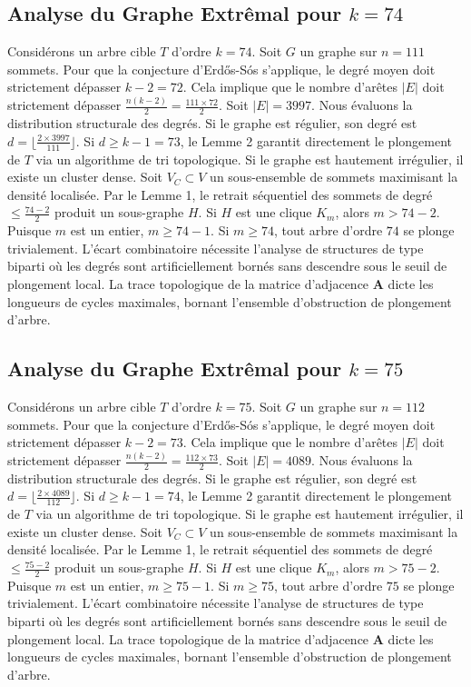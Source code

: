 \documentclass[11pt,a4paper]{article}
\begin{document}
\subsection{Analyse du Graphe Extr\^emal pour $k=74$}
Consid\'erons un arbre cible $T$ d'ordre $k=74$.
Soit $G$ un graphe sur $n=111$ sommets.
Pour que la conjecture d'Erd\H{o}s-S\'os s'applique, le degr\'e moyen doit strictement d\'epasser $k-2 = 72$.
Cela implique que le nombre d'ar\^etes $|E|$ doit strictement d\'epasser $\frac{n(k-2)}{2} = \frac{111 \times 72}{2}$.
Soit $|E| = 3997$.
Nous \'evaluons la distribution structurale des degr\'es. Si le graphe est r\'egulier, son degr\'e est $d = \lfloor \frac{2 \times 3997}{111} \rfloor$.
Si $d \geq k-1 = 73$, le Lemme 2 garantit directement le plongement de $T$ via un algorithme de tri topologique.
Si le graphe est hautement irr\'egulier, il existe un cluster dense. Soit $V_C \subset V$ un sous-ensemble de sommets maximisant la densit\'e localis\'ee.
Par le Lemme 1, le retrait s\'equentiel des sommets de degr\'e $\leq \frac{74-2}{2}$ produit un sous-graphe $H$.
Si $H$ est une clique $K_{m}$, alors $m > 74-2$. Puisque $m$ est un entier, $m \geq 74-1$. Si $m \geq 74$, tout arbre d'ordre $74$ se plonge trivialement.
L'\'ecart combinatoire n\'ecessite l'analyse de structures de type biparti o\`u les degr\'es sont artificiellement born\'es sans descendre sous le seuil de plongement local. La trace topologique de la matrice d'adjacence $\mathbf{A}$ dicte les longueurs de cycles maximales, bornant l'ensemble d'obstruction de plongement d'arbre.


\subsection{Analyse du Graphe Extr\^emal pour $k=75$}
Consid\'erons un arbre cible $T$ d'ordre $k=75$.
Soit $G$ un graphe sur $n=112$ sommets.
Pour que la conjecture d'Erd\H{o}s-S\'os s'applique, le degr\'e moyen doit strictement d\'epasser $k-2 = 73$.
Cela implique que le nombre d'ar\^etes $|E|$ doit strictement d\'epasser $\frac{n(k-2)}{2} = \frac{112 \times 73}{2}$.
Soit $|E| = 4089$.
Nous \'evaluons la distribution structurale des degr\'es. Si le graphe est r\'egulier, son degr\'e est $d = \lfloor \frac{2 \times 4089}{112} \rfloor$.
Si $d \geq k-1 = 74$, le Lemme 2 garantit directement le plongement de $T$ via un algorithme de tri topologique.
Si le graphe est hautement irr\'egulier, il existe un cluster dense. Soit $V_C \subset V$ un sous-ensemble de sommets maximisant la densit\'e localis\'ee.
Par le Lemme 1, le retrait s\'equentiel des sommets de degr\'e $\leq \frac{75-2}{2}$ produit un sous-graphe $H$.
Si $H$ est une clique $K_{m}$, alors $m > 75-2$. Puisque $m$ est un entier, $m \geq 75-1$. Si $m \geq 75$, tout arbre d'ordre $75$ se plonge trivialement.
L'\'ecart combinatoire n\'ecessite l'analyse de structures de type biparti o\`u les degr\'es sont artificiellement born\'es sans descendre sous le seuil de plongement local. La trace topologique de la matrice d'adjacence $\mathbf{A}$ dicte les longueurs de cycles maximales, bornant l'ensemble d'obstruction de plongement d'arbre.
\end{document}
